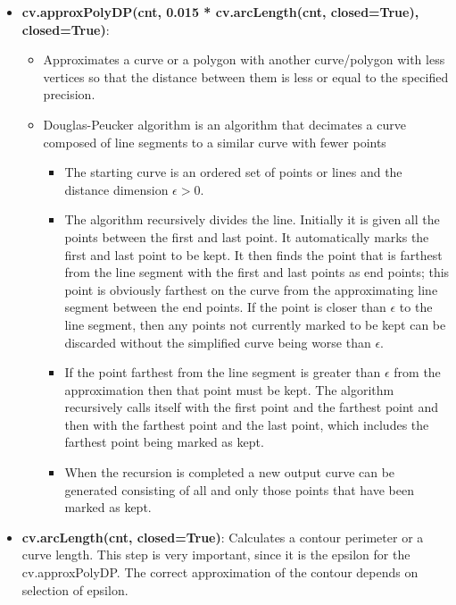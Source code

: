 \documentclass{article}
\begin{document}
\begin{itemize}
    \item \textbf{cv.approxPolyDP(cnt, 0.015 * cv.arcLength(cnt, closed=True), closed=True)}:
    \begin{itemize}
        \item Approximates a curve or a polygon with another curve/polygon with less vertices so that the distance between them is less or equal to the specified precision.
        \item Douglas-Peucker algorithm is an algorithm that decimates a curve composed of line segments to a similar curve with fewer points
        \begin{itemize}
            \item The starting curve is an ordered set of points or lines and the distance dimension \(\epsilon > 0\).
            \item The algorithm recursively divides the line. Initially it is given all the points between the first and last point. It automatically marks the first and last point to be kept. It then finds the point that is farthest from the line segment with the first and last points as end points; this point is obviously farthest on the curve from the approximating line segment between the end points. If the point is closer than \(\epsilon\) to the line segment, then any points not currently marked to be kept can be discarded without the simplified curve being worse than \(\epsilon\).
            \item If the point farthest from the line segment is greater than \(\epsilon\) from the approximation then that point must be kept. The algorithm recursively calls itself with the first point and the farthest point and then with the farthest point and the last point, which includes the farthest point being marked as kept. 
            \item When the recursion is completed a new output curve can be generated consisting of all and only those points that have been marked as kept.
        \end{itemize}
    \end{itemize}

    \item \textbf{cv.arcLength(cnt, closed=True)}: Calculates a contour perimeter or a curve length. This step is very important, since it is the epsilon for the cv.approxPolyDP. The correct approximation of the contour depends on selection of epsilon.


\end{itemize}
\end{document}
